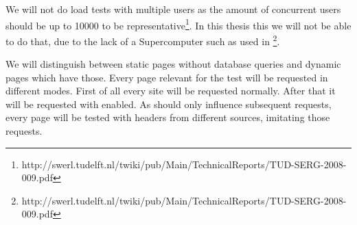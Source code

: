 We will not do load tests with multiple users as the amount of concurrent users should be up to 10000 to be representative\footnote{http://swerl.tudelft.nl/twiki/pub/Main/TechnicalReports/TUD-SERG-2008-009.pdf}.
In this thesis this we will not be able to do that, due to the lack of a Supercomputer such as used in \footnote{http://swerl.tudelft.nl/twiki/pub/Main/TechnicalReports/TUD-SERG-2008-009.pdf}.

We will distinguish between static pages without database queries and dynamic pages which have those.
Every page relevant for the test will be requested in different modes.
First of all every site will be requested normally.
After that it will be requested with \lare{} enabled.
As \lare{} should only influence subsequent requests, every page will be tested with \http{} headers from different sources, imitating those requests.

%
%
%


